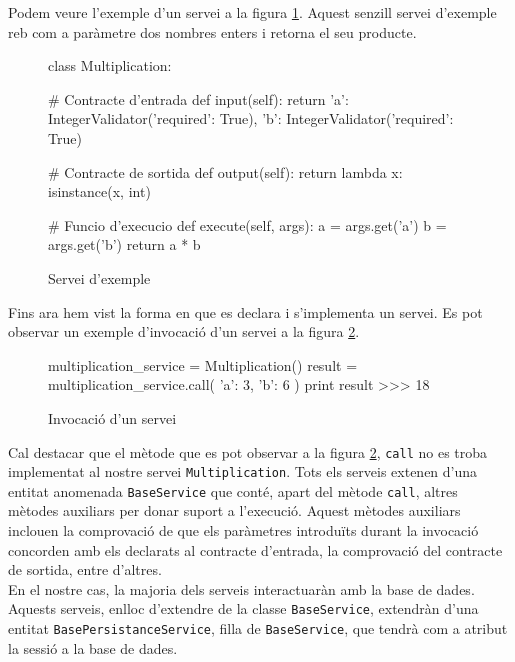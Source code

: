 	Podem veure l'exemple d'un servei a la figura \ref{fig:ex_servei}. Aquest senzill servei d'exemple reb com a paràmetre dos nombres enters i retorna el seu producte. 
	
	\begin{figure}[h!]
		\begin{python}
class Multiplication:
	
	# Contracte d'entrada
	def input(self):
		return {
			'a': IntegerValidator({'required': True}),
			'b': IntegerValidator({'required': True})
		}
	
	# Contracte de sortida
	def output(self):
		return lambda x: isinstance(x, int)
		
	# Funcio d'execucio
	def execute(self, args):
		a = args.get('a')
		b = args.get('b')
		return a * b
		\end{python}
		\caption{Servei d'exemple}
		\label{fig:ex_servei}
	\end{figure}
	
	Fins ara hem vist la forma en que es declara i s'implementa un servei. Es pot observar un exemple d'invocació d'un servei a la figura \ref{fig:invocacio_servei}. \\
	
		\begin{figure}[h!]
		\begin{python}
multiplication_service = Multiplication()
result = multiplication_service.call({
	'a': 3,
	'b': 6
})
print result
>>> 18
		\end{python}
		\caption{Invocació d'un servei}
		\label{fig:invocacio_servei}
	\end{figure}
	
	Cal destacar que el mètode que es pot observar a la figura \ref{fig:invocacio_servei}, \texttt{call} no es troba implementat al nostre servei \texttt{Multiplication}. Tots els serveis extenen d'una entitat anomenada \texttt{BaseService} que conté, apart del mètode \texttt{call}, altres mètodes auxiliars per donar suport a l'execució. Aquest mètodes auxiliars inclouen la comprovació de que els paràmetres introduïts durant la invocació concorden amb els declarats al contracte d'entrada, la comprovació del contracte de sortida, entre d'altres.\\
	
	En el nostre cas, la majoria dels serveis interactuaràn amb la base de dades. Aquests serveis, enlloc d'extendre de la classe \texttt{BaseService}, extendràn d'una entitat \texttt{BasePersistanceService}, filla de \texttt{BaseService}, que tendrà com a atribut la sessió a la base de dades.

